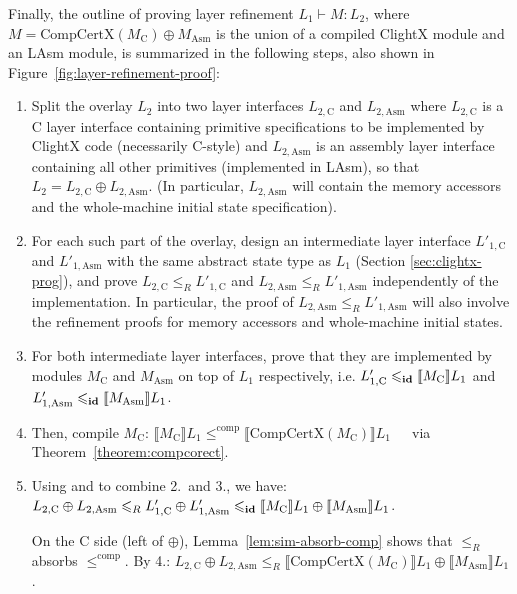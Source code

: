Finally, the outline of proving layer refinement $L_1 \vdash M : L_2$,
where $M = \textrm{CompCertX}(M_\text{C}) \oplus M_\text{Asm}$ is the union
of a compiled ClightX module and an LAsm module,
is summarized in the following steps, also shown in
Figure~\ref{fig:layer-refinement-proof}:
\begin{enumerate}   
\item Split the overlay $L_2$ into two layer interfaces
  $L_{2, \text{C}}$ and $L_{2, \text{Asm}}$ where $L_{2, \text{C}}$ is a C layer interface
  containing primitive specifications to be implemented by
  ClightX code (necessarily C-style) and $L_{2, \text{Asm}}$ is an assembly layer interface
  containing all other primitives (implemented in LAsm), so that $L_2 = L_{2, \text{C}} \oplus
  L_{2, \text{Asm}}$. (In particular, $L_{2, \text{Asm}}$ will contain the
  memory accessors and the whole-machine initial state specification).
\item For each such part of the overlay, design an intermediate layer interface
  $L'_{1, \text{C}}$ and $L'_{1, \text{Asm}}$ with the same abstract state type as
  $L_1$ (\cf Section \ref{sec:clightx-prog}), and
  prove $L_{2, \text{C}} \leqslant_R L'_{1, \text{C}}$ and $L_{2, \text{Asm}} \leqslant_R
  L'_{1, \text{Asm}}$ independently of the implementation. In
  particular, the proof of $L_{2, \text{Asm}} \leqslant_R
  L'_{1, \text{Asm}}$ will also involve the refinement proofs for memory
  accessors and whole-machine initial states.
\item For both intermediate layer interfaces, prove that they are implemented by
  modules $M_\text{C}$ and $M_\text{Asm}$ on top of
  $L_1$ respectively, i.e.  $L'_{1, \text{C}} \leqslant_{\textbf{id}} \llbracket M_\text{C} \rrbracket L_1$ and
  $L'_{1,\text{Asm}} \leqslant_{\textbf{id}} \llbracket M_{\text{Asm}} \rrbracket L_1$.
\item Then, compile $M_\text{C}$:
$\llbracket M_\text{C}
  \rrbracket L_1 \leqslant^{\textrm{comp}} \llbracket
  \textrm{CompCertX}(M_\text{C}) \rrbracket L_1$~~~via Theorem~\ref{theorem:compcorect}.

\item
Using  and  to combine 2.\ and 3., we have:
$
L_{2, \text{C}} \oplus L_{2, \text{Asm}}
\leqslant_R
  L'_{1, \text{C}} \oplus L'_{1, \text{Asm}}
\leqslant_{\textbf{id}}
  \llbracket M_\text{C} \rrbracket L_1 \oplus
  \llbracket M_{\text{Asm}} \rrbracket L_1
$.

On the C side (left of $\oplus$), Lemma~\ref{lem:sim-absorb-comp} shows that
$\leqslant_R$ absorbs $\leqslant^{\textrm{comp}}$.  By 4.:
$
L_{2, \text{C}} \oplus L_{2, \text{Asm}} \leqslant_R
  \llbracket \textrm{CompCertX}(M_\text{C}) \rrbracket L_1 \oplus 
  \llbracket M_{\text{Asm}} \rrbracket L_1
$.


\end{enumerate}
